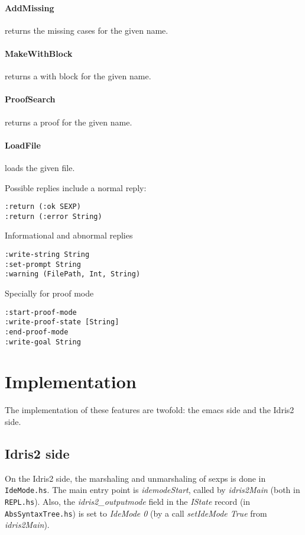 \documentclass{article}
\begin{document}
\paragraph{AddMissing} returns the missing cases for the given name.

\paragraph{MakeWithBlock} returns a with block for the given name.

\paragraph{ProofSearch} returns a proof for the given name.

\paragraph{LoadFile} loads the given file.

Possible replies include a normal reply:
\begin{verbatim}
:return (:ok SEXP)
:return (:error String)
\end{verbatim}

Informational and abnormal replies
\begin{verbatim}
:write-string String
:set-prompt String
:warning (FilePath, Int, String)
\end{verbatim}

Specially for proof mode
\begin{verbatim}
:start-proof-mode
:write-proof-state [String]
:end-proof-mode
:write-goal String
\end{verbatim}

\section{Implementation}
The implementation of these features are twofold: the emacs side and the Idris2 side.

\subsection{Idris2 side}
On the Idris2 side, the marshaling and unmarshaling of sexps is done in \texttt{IdeMode.hs}.
The main entry point is \emph{idemodeStart}, called by \emph{idris2Main} (both in \texttt{REPL.hs}).
Also, the \emph{idris2\_outputmode} field in the \emph{IState} record (in \texttt{AbsSyntaxTree.hs}) is set to \emph{IdeMode 0} (by a call \emph{setIdeMode True} from \emph{idris2Main}).
\end{document}
